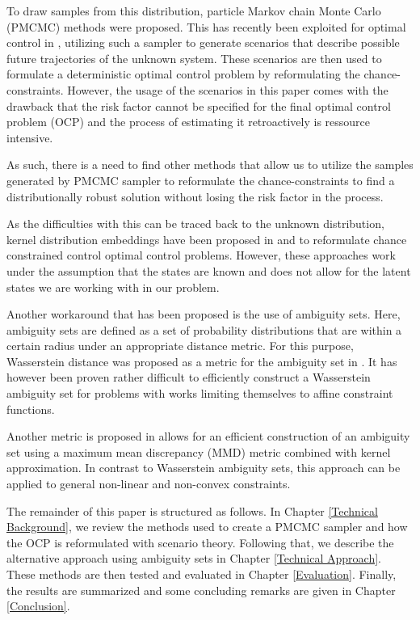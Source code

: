 To draw samples from this distribution, particle Markov chain Monte Carlo (PMCMC) methods \cite{Andrieu_10} were proposed. This has recently been exploited for optimal control in \cite{Robert_24} , utilizing such a sampler to generate scenarios that describe possible future trajectories of the unknown system. These scenarios are then used to formulate a deterministic optimal control problem by reformulating the chance-constraints. However, the usage of the scenarios in this paper comes with the drawback that the risk factor cannot be specified for the final optimal control problem (OCP) and the process of estimating it retroactively is ressource intensive.

As such, there is a need to find other methods that allow us to utilize the samples generated by PMCMC sampler to reformulate the chance-constraints to find a distributionally robust solution without losing the risk factor in the process. 

As the difficulties with this can be traced back to the unknown distribution, kernel distribution embeddings have been proposed in \cite{Adam_21} and \cite{Adam_22} to reformulate chance constrained control optimal control problems. However, these approaches work under the assumption that the states are known and does not allow for the latent states we are working with in our problem.

Another workaround that has been proposed is the use of ambiguity sets. Here, ambiguity sets are defined as a set of probability distributions that are within a certain radius under an appropriate distance metric. For this purpose, Wasserstein distance was proposed as a metric for the ambiguity set in \cite{Hota_19}. It has however been proven rather difficult to efficiently construct a Wasserstein ambiguity set for problems with works limiting themselves to affine constraint functions. 

Another metric is proposed in \cite{Yassine_22} allows for an efficient construction of an ambiguity set using a maximum mean discrepancy (MMD) metric combined with kernel approximation. In contrast to Wasserstein ambiguity sets, this approach can be applied to general non-linear and non-convex constraints.

The remainder of this paper is structured as follows. In Chapter \ref{Technical Background}, we review the methods used to create a PMCMC sampler and how the OCP is reformulated with scenario theory. Following that, we describe the alternative approach using ambiguity sets in Chapter \ref{Technical Approach}. These methods are then tested and evaluated in Chapter \ref{Evaluation}. Finally, the results are summarized and some concluding remarks are given in Chapter \ref{Conclusion}.



